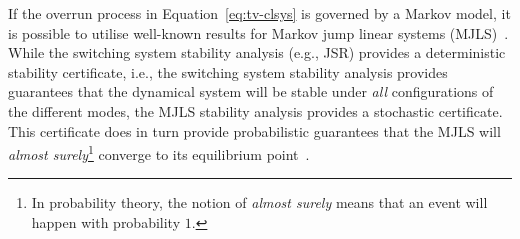 If the overrun process in Equation~\eqref{eq:tv-clsys} is governed by a Markov model, it is possible to utilise well-known results for Markov jump linear systems (MJLS)~\cite{Lincoln:2002, Feng:1992, Nilsson:1998}.
While the switching system stability analysis (e.g., JSR) provides a deterministic stability certificate, i.e., the switching system stability analysis provides guarantees that the dynamical system will be stable under \emph{all} configurations of the different modes, the MJLS stability analysis provides a stochastic certificate.
This certificate does in turn provide probabilistic guarantees that the MJLS will \emph{almost surely}\footnote{In probability theory, the notion of \emph{almost surely} means that an event will happen with probability $1$.} converge to its equilibrium point~\cite{Feng:1992}.

